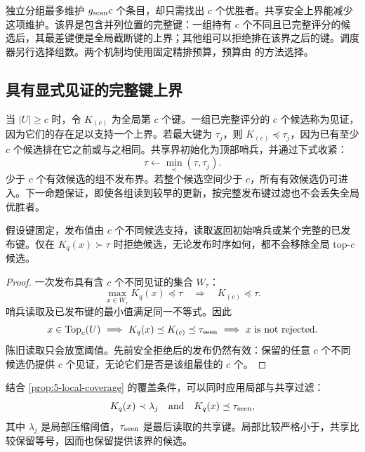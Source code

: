 独立分组最多维护 $g_{\mathrm{scan}} c$ 个条目，却只需找出 $c$ 个优胜者。共享安全上界能减少这项维护。该界是包含并列位置的完整键：一组持有 $c$ 个不同且已完整评分的候选后，其最差键便是全局截断键的上界；其他组可以拒绝排在该界之后的键。调度器另行选择组数。两个机制均使用固定精排预算，预算由  的方法选择。

\subsection{具有显式见证的完整键上界}

当 $|U|\geq c$ 时，令 $K_{(c)}$ 为全局第 $c$ 个键。一组已完整评分的 $c$ 个候选称为见证，因为它们的存在足以支持一个上界。若最大键为 $\tau_j$，则 $K_{(c)}\preceq\tau_j$，因为已有至少 $c$ 个候选排在它之前或与之相同。共享界初始化为顶部哨兵，并通过下式收紧：
\begin{equation}
 \tau\leftarrow\min_{\prec}(\tau,\tau_j).
 \label{eq:5-shared-update}
\end{equation}
少于 $c$ 个有效候选的组不发布界。若整个候选空间少于 $c$，所有有效候选仍可进入。下一命题保证，即使各组读到较早的更新，按完整发布键过滤也不会丢失全局优胜者。

\begin{resultblock}
\begin{proposition}[见证阈值下的安全拒绝]
\label{prop:5-shared-bound}
假设键固定，发布值由 $c$ 个不同候选支持，读取返回初始哨兵或某个完整的已发布键。仅在 $K_q(x)\succ\tau$ 时拒绝候选，无论发布时序如何，都不会移除全局 top-$c$ 候选。
\end{proposition}
\begin{proof}
一次发布具有含 $c$ 个不同见证的集合 $W_\tau$：
\[
 \max_{x\in W_\tau}K_q(x)\preceq\tau
 \quad\Longrightarrow\quad K_{(c)}\preceq\tau.
\]
哨兵读取及已发布键的最小值满足同一不等式。因此
\[
 x\in\operatorname{Top}_c(U)
 \ \Longrightarrow\ K_q(x)\preceq K_{(c)}\preceq\tau_{\rm seen}
 \ \Longrightarrow\ x\text{ is not rejected}.
\]
陈旧读取只会放宽阈值。先前安全拒绝后的发布仍然有效：保留的任意 $c$ 个不同候选仍提供 $c$ 个见证，无论它们是否是该组最佳的 $c$ 个。
\end{proof}
\end{resultblock}
结合 \cref{prop:5-local-coverage} 的覆盖条件，可以同时应用局部与共享过滤：
\begin{equation}
 K_q(x)\prec\lambda_j
 \quad\text{and}\quad
 K_q(x)\preceq\tau_{\rm seen},
 \label{eq:5-admission}
\end{equation}
其中 $\lambda_j$ 是局部压缩阈值，$\tau_{\rm seen}$ 是最后读取的共享键。局部比较严格小于，共享比较保留等号，因而也保留提供该界的候选。

